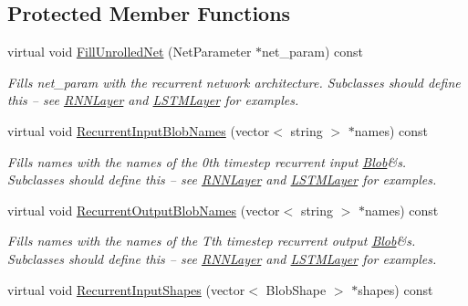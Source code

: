 \subsection*{Protected Member Functions}
\begin{DoxyCompactItemize}
\item 
virtual void \hyperlink{classcaffe_1_1RNNLayer_ace6e6dd74b4ce47f6b65637560316dd5}{Fill\+Unrolled\+Net} (Net\+Parameter $\ast$net\+\_\+param) const \hypertarget{classcaffe_1_1RNNLayer_ace6e6dd74b4ce47f6b65637560316dd5}{}\label{classcaffe_1_1RNNLayer_ace6e6dd74b4ce47f6b65637560316dd5}

\begin{DoxyCompactList}\small\item\em Fills net\+\_\+param with the recurrent network architecture. Subclasses should define this -- see \hyperlink{classcaffe_1_1RNNLayer}{R\+N\+N\+Layer} and \hyperlink{classcaffe_1_1LSTMLayer}{L\+S\+T\+M\+Layer} for examples. \end{DoxyCompactList}\item 
virtual void \hyperlink{classcaffe_1_1RNNLayer_a86aa3de1fd4cc747a375a381c317c05b}{Recurrent\+Input\+Blob\+Names} (vector$<$ string $>$ $\ast$names) const \hypertarget{classcaffe_1_1RNNLayer_a86aa3de1fd4cc747a375a381c317c05b}{}\label{classcaffe_1_1RNNLayer_a86aa3de1fd4cc747a375a381c317c05b}

\begin{DoxyCompactList}\small\item\em Fills names with the names of the 0th timestep recurrent input \hyperlink{classcaffe_1_1Blob}{Blob}\&s. Subclasses should define this -- see \hyperlink{classcaffe_1_1RNNLayer}{R\+N\+N\+Layer} and \hyperlink{classcaffe_1_1LSTMLayer}{L\+S\+T\+M\+Layer} for examples. \end{DoxyCompactList}\item 
virtual void \hyperlink{classcaffe_1_1RNNLayer_a8d4d9ab9000cb15f8f5c9566c0c3bf79}{Recurrent\+Output\+Blob\+Names} (vector$<$ string $>$ $\ast$names) const \hypertarget{classcaffe_1_1RNNLayer_a8d4d9ab9000cb15f8f5c9566c0c3bf79}{}\label{classcaffe_1_1RNNLayer_a8d4d9ab9000cb15f8f5c9566c0c3bf79}

\begin{DoxyCompactList}\small\item\em Fills names with the names of the Tth timestep recurrent output \hyperlink{classcaffe_1_1Blob}{Blob}\&s. Subclasses should define this -- see \hyperlink{classcaffe_1_1RNNLayer}{R\+N\+N\+Layer} and \hyperlink{classcaffe_1_1LSTMLayer}{L\+S\+T\+M\+Layer} for examples. \end{DoxyCompactList}\item 
virtual void \hyperlink{classcaffe_1_1RNNLayer_a9bf94bd086bf28433b5ebf6bdde63ed6}{Recurrent\+Input\+Shapes} (vector$<$ Blob\+Shape $>$ $\ast$shapes) const \hypertarget{classcaffe_1_1RNNLayer_a9bf94bd086bf28433b5ebf6bdde63ed6}{}\label{classcaffe_1_1RNNLayer_a9bf94bd086bf28433b5ebf6bdde63ed6}


\end{DoxyCompactItemize}
